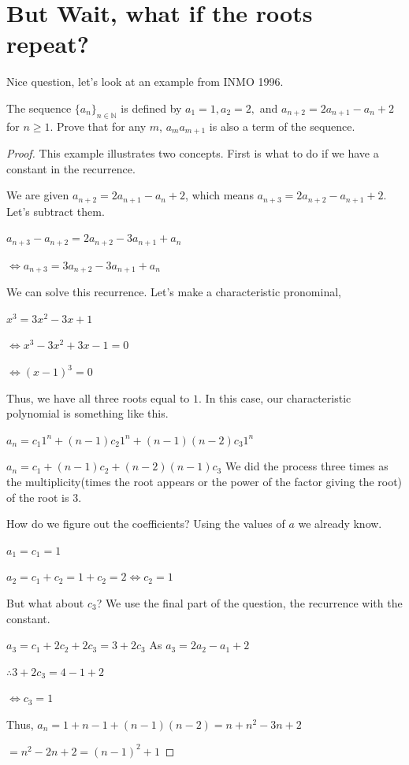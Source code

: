 \section{But Wait, what if the roots repeat?}
Nice question, let's look at an example from INMO 1996.
\begin{example}
The sequence $\{a_n\}_{n\in \mathbb{N}}$ is defined by $a_1=1, a_2=2,$ and $a_{n+2}=2a_{n+1}-a_n+2$ for $n \geq 1$.
Prove that for any $m$, $a_m a_{m+1}$ is also a term of the sequence.
\end{example}
\begin{proof}
    This example illustrates two concepts. First is what to do if we have a constant in the recurrence.\par
  We are given  $a_{n+2}=2a_{n+1}-a_n+2$, which means $a_{n+3}=2a_{n+2}-a_{n+1}+2$. Let's subtract them.\par
  $a_{n+3}-a_{n+2}=2a_{n+2}-3a_{n+1}+a_n$\par
  $\iff a_{n+3}=3a_{n+2}-3a_{n+1}+a_n$\par
  We can solve this recurrence. Let's make a characteristic pronominal,\par
  $x^3=3x^2-3x+1$\par
  $\iff x^3-3x^2+3x-1=0$\par
  $\iff (x-1)^3=0$\par
  Thus, we have all three roots equal to $1$. In this case, our characteristic polynomial is something like this.\par
  $a_n=c_1 1^n+(n-1)c_2 1^n+(n-1)(n-2)c_3 1^n$\par
$a_n=c_1+(n-1)c_2+(n-2)(n-1)c_3$
We did the process three times as the multiplicity(times the root appears or the power of the factor giving the root) of the root is $3$.\par
How do we figure out the coefficients? Using the values of $a$ we already know.\par
$a_1=c_1=1$\par
$a_2=c_1+c_2=1+c_2=2 \iff c_2=1$\par
But what about $c_3$? We use the final part of the question, the recurrence with the constant.\par
$a_3=c_1+2c_2+2c_3=3+2c_3$
As $a_3=2a_2-a_1+2$\par
$\therefore 3+2c_3=4-1+2$\par
$\iff c_3=1$\par
Thus, $a_n=1+n-1+(n-1)(n-2)=n+n^2-3n+2$\par
$=n^2-2n+2=(n-1)^2+1$\par

\end{proof}
